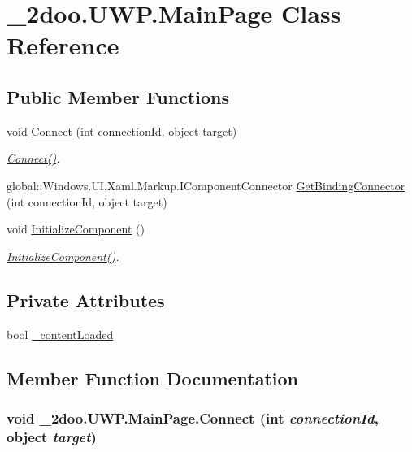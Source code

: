 \hypertarget{class__2doo_1_1_u_w_p_1_1_main_page}{
\section{\_\-2doo.UWP.MainPage Class Reference}
\label{class__2doo_1_1_u_w_p_1_1_main_page}
}
\subsection*{Public Member Functions}
\begin{CompactItemize}
\item 
void \hyperlink{class__2doo_1_1_u_w_p_1_1_main_page_19b5e48caf65309421bc1b6f9f0cff39}{Connect} (int connectionId, object target)
\begin{CompactList}\small\item\em \hyperlink{class__2doo_1_1_u_w_p_1_1_main_page_19b5e48caf65309421bc1b6f9f0cff39}{Connect()}. \item\end{CompactList}\item 
global::Windows.UI.Xaml.Markup.IComponentConnector \hyperlink{class__2doo_1_1_u_w_p_1_1_main_page_99e782bd3eb749c808aba886da1488a4}{GetBindingConnector} (int connectionId, object target)
\item 
void \hyperlink{class__2doo_1_1_u_w_p_1_1_main_page_98a190ba4dbbecc8f3d723b2c50608f0}{InitializeComponent} ()
\begin{CompactList}\small\item\em \hyperlink{class__2doo_1_1_u_w_p_1_1_main_page_98a190ba4dbbecc8f3d723b2c50608f0}{InitializeComponent()}. \item\end{CompactList}\end{CompactItemize}
\subsection*{Private Attributes}
\begin{CompactItemize}
\item 
bool \hyperlink{class__2doo_1_1_u_w_p_1_1_main_page_78bcf08558e11c9266da0f63a9439665}{\_\-contentLoaded}
\end{CompactItemize}


\subsection{Member Function Documentation}
\hypertarget{class__2doo_1_1_u_w_p_1_1_main_page_19b5e48caf65309421bc1b6f9f0cff39}{
\subsubsection[{Connect}]{\setlength{\rightskip}{0pt plus 5cm}void \_\-2doo.UWP.MainPage.Connect (int {\em connectionId}, \/  object {\em target})}}
\label{class__2doo_1_1_u_w_p_1_1_main_page_19b5e48caf65309421bc1b6f9f0cff39}


